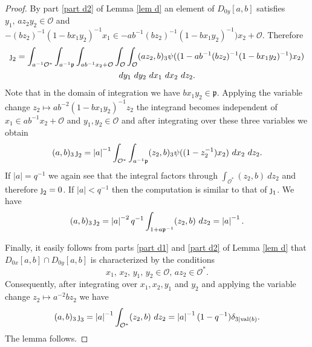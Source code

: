\documentclass[12pt]{amsart}
\newcommand{\abs}[1]{\left|{#1}\right|}
\newcommand{\p}{\mathfrak{p}}
\renewcommand{\O}{\mathcal{O}}
\newcommand{\val}{{\operatorname{val}}}
\theoremstyle{remark}
\begin{document}
\begin{proof}
By part \ref{part d2} of Lemma \ref{lem d} an element of $D_{0y}[a,b]$ satisfies 
$y_1,\,az_2y_2\in \O$ and $-(b z_2)^{-1}(1-bx_1y_2)^{-1}x_1\in -ab^{-1}(b z_2)^{-1}(1-bx_1y_2)^{-1})x_2+ \O$. Therefore
\begin{multline*}
\text{\j}_2=\int_{a^{-1}\O^*}\int_{a^{-1}\p}\int_{ab^{-1}x_2+\O}\int_\O\int_\O (az_2,b)_3\psi((1-ab^{-1}(b z_2)^{-1}(1-bx_1y_2)^{-1})x_2)\\ dy_1\ dy_2\ dx_1\ dx_2\ dz_2.
\end{multline*}
Note that in the domain of integration we have $bx_1y_2\in \p$. Applying the variable change $z_2\mapsto ab^{-2}(1-bx_1y_2)^{-1}z_2$ 
the integrand becomes independent of $x_1\in ab^{-1}x_2+\O$ and $ y_1,y_2\in \O$ and after integrating over these three variables we obtain
\[
(a,b)_3\, \text{\j}_2=\abs{a}^{-1}\int_{\O^*}\int_{a^{-1}\p} (z_2,b)_3\psi((1-z_2^{-1})x_2)\ dx_2\ dz_2.
\]
If $\abs{a}=q^{-1}$ we again see that the integral factors through $\int_{\O^*} (z_2,b)\ dz_2$ and therefore $\text{\j}_2=0$.
If $\abs{a}<q^{-1}$ then the computation is similar to that of $\text{\j}_1$. We have
\[
(a,b)_3\, \text{\j}_2=\abs{a}^{-2}q^{-1}\int_{1+a\p^{-1}}(z_2,b)\ dz_2=\abs{a}^{-1}.
\]

Finally, it easily follows from parts \ref{part d1} and \ref{part d2} of Lemma \ref{lem d} that $D_{0x}[a,b]\cap D_{0y}[a,b]$ is characterized by the conditions 
\[
x_1,\,x_2,\,y_1,\,y_2\in \O,\,az_2\in\O^*.
\]
Consequently, after integrating over $x_1, x_2, y_1$ and $y_2$ and applying the variable change $z_2\mapsto a^{-2}bz_2$ we have
\[
(a,b)_3\, \text{\j}_3=\abs{a}^{-1}\int_{\O^*}(z_2,b)\ dz_2=\abs{a}^{-1}(1-q^{-1})\delta_{3|\val(b)}.
\]
The lemma follows.
\end{proof}
\end{document}
